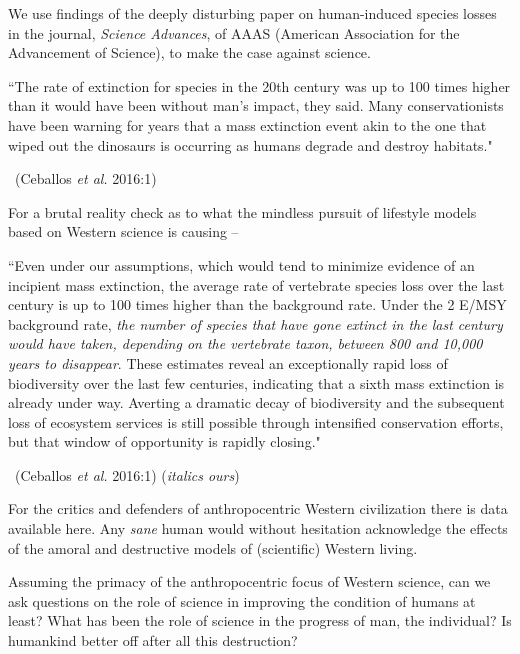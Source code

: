We use findings of the deeply disturbing paper on human-induced species losses in the journal, \textit{Science Advances}, of AAAS (American Association for the Advancement of Science), to make the case against science.

\begin{myquote}
“The rate of extinction for species in the 20th century was up to 100 times higher than it would have been without man’s impact, they said. Many conservationists have been warning for years that a mass extinction event akin to the one that wiped out the dinosaurs is occurring as humans degrade and destroy habitats." 

\vskip -5pt

~\hfill (Ceballos \textit{et al.} 2016:1)
\end{myquote}

For a brutal reality check as to what the mindless pursuit of lifestyle models based on Western science is causing –

\begin{myquote}
“Even under our assumptions, which would tend to minimize evidence of an incipient mass extinction, the average rate of vertebrate species loss over the last century is up to 100 times higher than the background rate. Under the 2 E/MSY background rate, \textit{the number of species that have gone extinct in the last century would have taken, depending on the vertebrate taxon, between 800 and 10,000 years to disappear}. These estimates reveal an exceptionally rapid loss of biodiversity over the last few centuries, indicating that a sixth mass extinction is already under way. Averting a dramatic decay of biodiversity and the subsequent loss of ecosystem services is still possible through intensified conservation efforts, but that window of opportunity is rapidly closing." 

~\hfill (Ceballos \textit{et al.} 2016:1) (\textit{italics ours})
\end{myquote}

For the critics and defenders of anthropocentric Western civilization there is data available here. Any \textit{sane} human would without hesitation acknowledge the effects of the amoral and destructive models of (scientific) Western living.

Assuming the primacy of the anthropocentric focus of Western science, can we ask questions on the role of science in improving the condition of humans at least? What has been the role of science in the progress of man, the individual? Is humankind better off after all this destruction?

